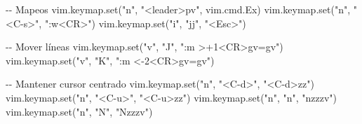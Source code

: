 \documentclass[
  doc,
  floatsintext,
  longtable,
  a4paper,
  nolmodern,
  notxfonts,
  notimes,
  12pt,
  colorlinks=true,linkcolor=blue,citecolor=blue,urlcolor=blue]{apa7}
\newenvironment{Shaded}{\begin{snugshade}}{\end{snugshade}}
\newcommand{\CommentTok}[1]{\textcolor[rgb]{0.37,0.37,0.37}{#1}}
\newcommand{\NormalTok}[1]{\textcolor[rgb]{0.00,0.23,0.31}{#1}}
\newcommand{\OperatorTok}[1]{\textcolor[rgb]{0.37,0.37,0.37}{#1}}
\newcommand{\StringTok}[1]{\textcolor[rgb]{0.13,0.47,0.30}{#1}}
\newcommand{\VariableTok}[1]{\textcolor[rgb]{0.07,0.07,0.07}{#1}}
\begin{document}
\begin{Shaded}
\begin{Highlighting}[]
\CommentTok{{-}{-} Mapeos}
\VariableTok{vim}\OperatorTok{.}\VariableTok{keymap}\OperatorTok{.}\NormalTok{set}\OperatorTok{(}\StringTok{"n"}\OperatorTok{,} \StringTok{"\textless{}leader\textgreater{}pv"}\OperatorTok{,} \VariableTok{vim}\OperatorTok{.}\VariableTok{cmd}\OperatorTok{.}\VariableTok{Ex}\OperatorTok{)}
\VariableTok{vim}\OperatorTok{.}\VariableTok{keymap}\OperatorTok{.}\NormalTok{set}\OperatorTok{(}\StringTok{"n"}\OperatorTok{,} \StringTok{"\textless{}C{-}s\textgreater{}"}\OperatorTok{,} \StringTok{":w\textless{}CR\textgreater{}"}\OperatorTok{)}
\VariableTok{vim}\OperatorTok{.}\VariableTok{keymap}\OperatorTok{.}\NormalTok{set}\OperatorTok{(}\StringTok{"i"}\OperatorTok{,} \StringTok{"jj"}\OperatorTok{,} \StringTok{"\textless{}Esc\textgreater{}"}\OperatorTok{)}

\CommentTok{{-}{-} Mover líneas}
\VariableTok{vim}\OperatorTok{.}\VariableTok{keymap}\OperatorTok{.}\NormalTok{set}\OperatorTok{(}\StringTok{"v"}\OperatorTok{,} \StringTok{"J"}\OperatorTok{,} \StringTok{":m \textquotesingle{}\textgreater{}+1\textless{}CR\textgreater{}gv=gv"}\OperatorTok{)}
\VariableTok{vim}\OperatorTok{.}\VariableTok{keymap}\OperatorTok{.}\NormalTok{set}\OperatorTok{(}\StringTok{"v"}\OperatorTok{,} \StringTok{"K"}\OperatorTok{,} \StringTok{":m \textquotesingle{}\textless{}{-}2\textless{}CR\textgreater{}gv=gv"}\OperatorTok{)}

\CommentTok{{-}{-} Mantener cursor centrado}
\VariableTok{vim}\OperatorTok{.}\VariableTok{keymap}\OperatorTok{.}\NormalTok{set}\OperatorTok{(}\StringTok{"n"}\OperatorTok{,} \StringTok{"\textless{}C{-}d\textgreater{}"}\OperatorTok{,} \StringTok{"\textless{}C{-}d\textgreater{}zz"}\OperatorTok{)}
\VariableTok{vim}\OperatorTok{.}\VariableTok{keymap}\OperatorTok{.}\NormalTok{set}\OperatorTok{(}\StringTok{"n"}\OperatorTok{,} \StringTok{"\textless{}C{-}u\textgreater{}"}\OperatorTok{,} \StringTok{"\textless{}C{-}u\textgreater{}zz"}\OperatorTok{)}
\VariableTok{vim}\OperatorTok{.}\VariableTok{keymap}\OperatorTok{.}\NormalTok{set}\OperatorTok{(}\StringTok{"n"}\OperatorTok{,} \StringTok{"n"}\OperatorTok{,} \StringTok{"nzzzv"}\OperatorTok{)}
\VariableTok{vim}\OperatorTok{.}\VariableTok{keymap}\OperatorTok{.}\NormalTok{set}\OperatorTok{(}\StringTok{"n"}\OperatorTok{,} \StringTok{"N"}\OperatorTok{,} \StringTok{"Nzzzv"}\OperatorTok{)}


\end{Highlighting}
\end{Shaded}
\end{document}
